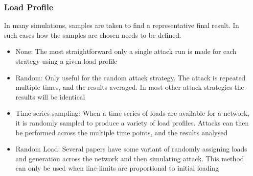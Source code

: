 \subsubsection{Load Profile}

In many simulations, samples are taken to find a representative final result. In such cases how the samples are chosen needs to be defined.

\begin{itemize}
    \item None: The most straightforward only a single attack run is made for each strategy using a given load profile
    \item Random: Only useful for the random attack strategy. The attack is repeated multiple times, and the results averaged. In most other attack strategies the results will be identical
    \item Time series sampling: When a time series of loads are available for a network, it is randomly sampled to produce a variety of load profiles. Attacks can then be performed across the multiple time points, and the results analysed
    \item Random Load: Several papers have some variant of randomly assigning loads and generation across the network and then simulating attack. This method can only be used when line-limits are proportional to initial loading
\end{itemize}

